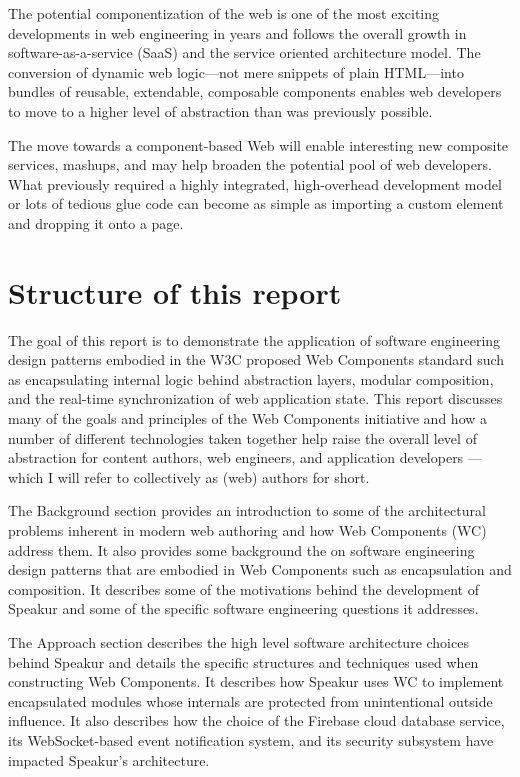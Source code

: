 The potential componentization of the web is one of the most exciting developments in web engineering in years and follows the overall growth in software-as-a-service (SaaS) 
and the service oriented architecture
model. 
The conversion of dynamic web logic---not mere snippets of plain HTML---into bundles of reusable, extendable, composable components enables web developers to move to a higher level of abstraction than was previously possible.

The move towards a component-based Web will enable interesting new composite services, mashups, and may help broaden the potential pool of web developers. 
What previously required a highly integrated, high-overhead development model or lots of tedious glue code can become as simple as importing a custom element and dropping it onto a page.


\section{Structure of this report}
%

The goal of this report is to demonstrate the application of 
software engineering 
design patterns embodied in the W3C proposed Web Components standard such as 
encapsulating internal logic 
behind abstraction layers, 
modular composition, 
and the real-time synchronization of web application state. 
This report discusses many of the goals and principles of the Web Components initiative and how a number of different technologies taken together help raise the overall level of 
abstraction for content authors, web engineers, and application developers --- which I will refer to collectively as (web) authors for short.

The Background section provides an introduction to some of the architectural problems inherent in modern web authoring and how Web Components (WC) address them. 
It also provides some background the on software engineering design patterns that are embodied in Web Components such as encapsulation and composition.
It describes some of the motivations behind the development of Speakur and some of the specific software engineering questions it addresses.

The Approach section describes the high level software architecture choices behind Speakur and details the specific structures and techniques used when constructing Web Components.
It describes how Speakur uses WC to implement encapsulated modules whose internals are protected from unintentional outside influence. 
It also describes how the choice of the Firebase cloud database service, its WebSocket-based event notification system, and its security subsystem have impacted Speakur's architecture.

